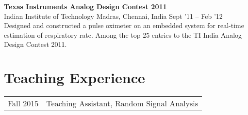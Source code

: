 \documentclass[margin,line,pifont,palatino,courier]{res}
\newenvironment{list1}{
  \begin{list}{\ding{113}}{%
      \setlength{\itemsep}{0in}
      \setlength{\parsep}{0in} \setlength{\parskip}{0in}
      \setlength{\topsep}{0in} \setlength{\partopsep}{0in}
      \setlength{\leftmargin}{0.17in}}}{\end{list}}
\begin{document}
\begin{resume}
\textbf{Texas Instruments Analog Design Contest 2011} \\
Indian Institute of Technology Madras, Chennai, India \hfill Sept '11 -- Feb '12 \vspace{2pt} \\
Designed and constructed a pulse oximeter on an embedded system for real-time estimation of respiratory rate. Among the top 25 entries to the TI India Analog Design Contest 2011.\\
\vspace{-5pt}

\section{\sc Teaching Experience}
\begin{tabular}{@{}p{0.9in} p{4in}}
Fall 2015 & Teaching Assistant, Random Signal Analysis \\
\end{tabular}

%
%
%


\end{resume}
\end{document}
